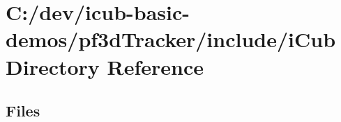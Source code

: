 \section{C\+:/dev/icub-\/basic-\/demos/pf3d\+Tracker/include/i\+Cub Directory Reference}
\label{dir_5ba73ae6ed0b41c8033623abea2a8464}
\subsection*{Files}
\begin{DoxyCompactItemize}
\end{DoxyCompactItemize}
